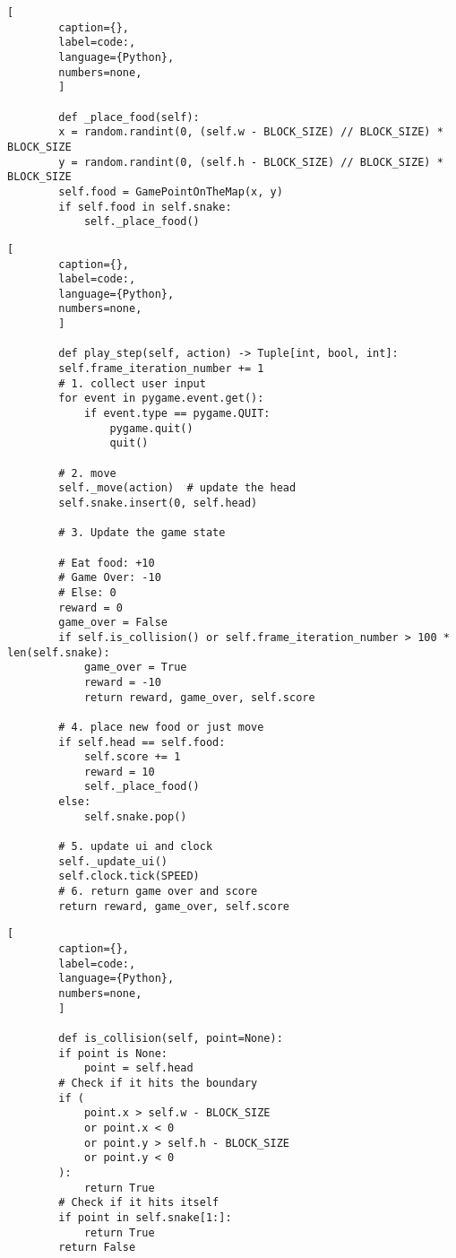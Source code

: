 \begin{onepage}
    \begin{lstlisting}[
        caption={},
        label=code:,
        language={Python},
        numbers=none,
        ]

        def _place_food(self):
        x = random.randint(0, (self.w - BLOCK_SIZE) // BLOCK_SIZE) * BLOCK_SIZE
        y = random.randint(0, (self.h - BLOCK_SIZE) // BLOCK_SIZE) * BLOCK_SIZE
        self.food = GamePointOnTheMap(x, y)
        if self.food in self.snake:
            self._place_food()
    \end{lstlisting}
\end{onepage}

\begin{onepage}
    \begin{lstlisting}[
        caption={},
        label=code:,
        language={Python},
        numbers=none,
        ]

        def play_step(self, action) -> Tuple[int, bool, int]:
        self.frame_iteration_number += 1
        # 1. collect user input
        for event in pygame.event.get():
            if event.type == pygame.QUIT:
                pygame.quit()
                quit()

        # 2. move
        self._move(action)  # update the head
        self.snake.insert(0, self.head)

        # 3. Update the game state

        # Eat food: +10
        # Game Over: -10
        # Else: 0
        reward = 0
        game_over = False
        if self.is_collision() or self.frame_iteration_number > 100 * len(self.snake):
            game_over = True
            reward = -10
            return reward, game_over, self.score

        # 4. place new food or just move
        if self.head == self.food:
            self.score += 1
            reward = 10
            self._place_food()
        else:
            self.snake.pop()

        # 5. update ui and clock
        self._update_ui()
        self.clock.tick(SPEED)
        # 6. return game over and score
        return reward, game_over, self.score

    \end{lstlisting}
\end{onepage}

\begin{onepage}
    \begin{lstlisting}[
        caption={},
        label=code:,
        language={Python},
        numbers=none,
        ]

        def is_collision(self, point=None):
        if point is None:
            point = self.head
        # Check if it hits the boundary
        if (
            point.x > self.w - BLOCK_SIZE
            or point.x < 0
            or point.y > self.h - BLOCK_SIZE
            or point.y < 0
        ):
            return True
        # Check if it hits itself
        if point in self.snake[1:]:
            return True
        return False
    \end{lstlisting}
\end{onepage}


